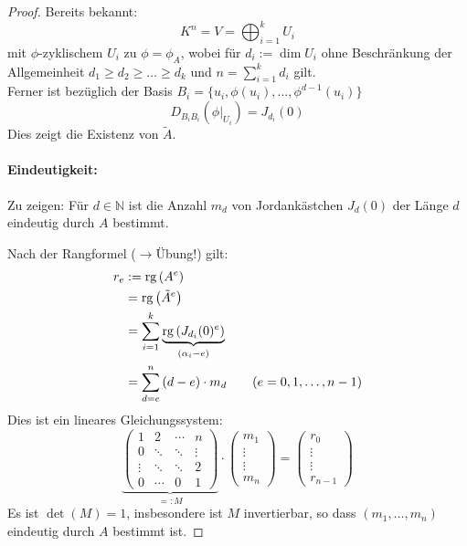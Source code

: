 \documentclass[parskip,a4paper,twoside,DIV15,BCOR12mm]{scrbook}
\begin{document}
\begin{proof}
Bereits bekannt:
\[
K^{n}=V=\bigoplus_{i=1}^{k}{U_{i}}
\]
mit \(\phi\)-zyklischem \(U_{i}\) zu \(\phi=\phi_{A}\), wobei für 
\(d_{i}:=\dim U_{i}\) ohne Beschränkung der Allgemeinheit 
\(d_{1}\geq d_{2}\geq\ldots\geq d_{k}\) und \(n=\sum_{i=1}^{k}{d_{i}}\) gilt.\\
Ferner ist bezüglich der Basis 
    \(B_{i}=\{u_{i},\phi(u_{i}),\ldots,\phi^{d-1}(u_{i})\}\)
\[
D_{B_{i}B_{i}}\left(\phi|_{U_{i}}\right)=J_{d_{i}}(0)
\]
Dies zeigt die Existenz von \(\tilde{A}\).
\paragraph{Eindeutigkeit:}{Zu zeigen: Für \(d\in\mathbb{N}\) ist die Anzahl
\(m_{d}\) von Jordankästchen \(J_{d}(0)\) der Länge \(d\) eindeutig durch
\(A\) bestimmt.

Nach der Rangformel (\(\longrightarrow\)Übung!) gilt:
\begin{align*}
r_{e}&:=\operatorname{rg}\left(A^{e}\right)\\
&=\operatorname{rg}\left(\tilde{A}^{e}\right)\\
&=\sum_{i=1}^{k}{
    \underbrace{\operatorname{rg}\left(J_{d_{i}}(0)^{e}\right)}_{(\alpha_{i}-e)}}\\
&=\sum_{d=e}^{n}{(d-e)\cdot m_{d}}\qquad(e=0,1,\ldots,n-1)
\end{align*}
Dies ist ein lineares Gleichungssystem:
\[
\underbrace{\begin{pmatrix}
    1&2&\cdots&n\\
    0&\ddots&\ddots&\vdots\\
    \vdots&\ddots&\ddots&2\\
    0&\cdots&0&1
\end{pmatrix}}_{=:M}\cdot
\begin{pmatrix}
    m_{1}\\\vdots\\\vdots\\m_{n}
\end{pmatrix}=
\begin{pmatrix}
    r_{0}\\\vdots\\\vdots\\r_{n-1}
\end{pmatrix}
\]
Es ist \(\det(M)=1\), insbesondere ist \(M\) invertierbar, so dass 
\((m_{1},\ldots,m_{n})\) eindeutig durch \(A\) bestimmt ist.
}
\end{proof}
\end{document}
